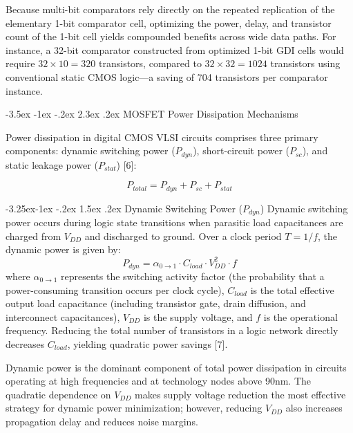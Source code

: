 \documentclass[12pt,a4paper,oneside]{report}
\makeatletter
\renewcommand\section{\@startsection {section}{1}{\z@}%
                                   {-3.5ex \@plus -1ex \@minus -.2ex}%
                                   {2.3ex \@plus.2ex}%
                                   {\normalfont\normalsize\bfseries}}
\renewcommand\subsection{\@startsection{subsection}{2}{\z@}%
                                     {-3.25ex\@plus -1ex \@minus -.2ex}%
                                     {1.5ex \@plus .2ex}%
                                     {\normalfont\normalsize\bfseries\itshape}}
\makeatother
\begin{document}
Because multi-bit comparators rely directly on the repeated replication of the elementary 1-bit comparator cell, optimizing the power, delay, and transistor count of the 1-bit cell yields compounded benefits across wide data paths. For instance, a 32-bit comparator constructed from optimized 1-bit GDI cells would require $32 \times 10 = 320$ transistors, compared to $32 \times 32 = 1024$ transistors using conventional static CMOS logic—a saving of 704 transistors per comparator instance.

\section{MOSFET Power Dissipation Mechanisms}

Power dissipation in digital CMOS VLSI circuits comprises three primary components: dynamic switching power ($P_{dyn}$), short-circuit power ($P_{sc}$), and static leakage power ($P_{stat}$) [6]:

\begin{equation}
P_{total} = P_{dyn} + P_{sc} + P_{stat}
\label{eq:ptotal}
\end{equation}

\subsection{Dynamic Switching Power ($P_{dyn}$)}
Dynamic switching power occurs during logic state transitions when parasitic load capacitances are charged from $V_{DD}$ and discharged to ground. Over a clock period $T = 1/f$, the dynamic power is given by:
\begin{equation}
P_{dyn} = \alpha_{0 \rightarrow 1} \cdot C_{load} \cdot V_{DD}^2 \cdot f
\label{eq:pdyn}
\end{equation}
where $\alpha_{0 \rightarrow 1}$ represents the switching activity factor (the probability that a power-consuming transition occurs per clock cycle), $C_{load}$ is the total effective output load capacitance (including transistor gate, drain diffusion, and interconnect capacitances), $V_{DD}$ is the supply voltage, and $f$ is the operational frequency. Reducing the total number of transistors in a logic network directly decreases $C_{load}$, yielding quadratic power savings [7].

Dynamic power is the dominant component of total power dissipation in circuits operating at high frequencies and at technology nodes above 90nm. The quadratic dependence on $V_{DD}$ makes supply voltage reduction the most effective strategy for dynamic power minimization; however, reducing $V_{DD}$ also increases propagation delay and reduces noise margins.
\end{document}
